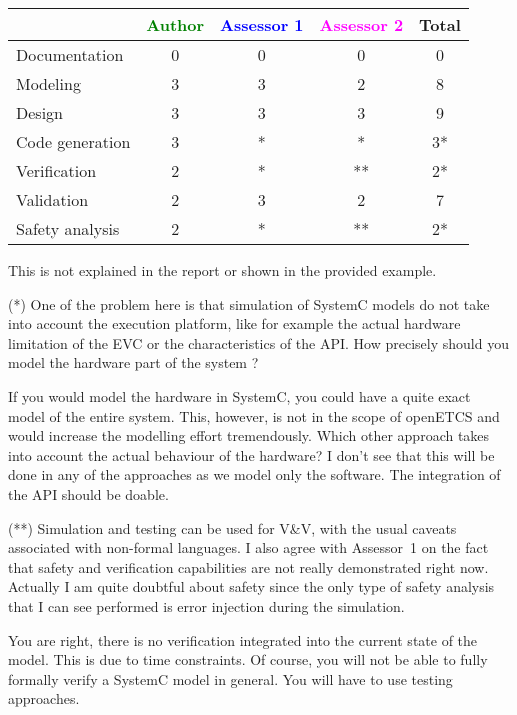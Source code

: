 \begin{tabular}{|l | c | c | c | c|}
\hline
& \textcolor{green}{Author} & \textcolor{blue}{Assessor 1} & \textcolor{magenta}{Assessor 2} & Total \\
\hline
Documentation &0 & 0 & 0 & 0 \\
\hline
Modeling &3 & 3 & 2 & 8 \\
\hline
Design &3 &3 & 3 & 9 \\
\hline
Code generation &3 & *  & * & 3* \\
\hline
Verification &2 &* & ** & 2* \\
\hline
Validation &2 &3 & 2 & 7 \\
\hline
Safety analysis &2 &* & ** & 2* \\
\hline
\end{tabular}
\begin{assessor1}
This is not explained in the report or shown in  the provided example.
\end{assessor1}

\begin{assessor2}
  \begin{item}
  \item[(*)] One of the problem here is that simulation of SystemC
    models do not take into account the execution platform, like for
    example the actual hardware limitation of the EVC or the
    characteristics of the API. How precisely should you model the
    hardware part of the system ?
\begin{author_comment}
If you would model the hardware in SystemC, you could have a quite exact model of the entire system. This, however, is not in the scope of openETCS and would increase the modelling effort tremendously. Which other approach takes into account the actual behaviour of the hardware? I don't see that this will be done in any of the approaches as we model only the software. The integration of the API should be doable.
\end{author_comment}
  \item[(**)] Simulation and testing can be used for V\&V, with the
    usual caveats associated with non-formal languages. I also agree
    with Assessor~1 on the fact that safety and verification
    capabilities are not really demonstrated right now. Actually I am
    quite doubtful about safety since the only type of safety analysis
    that I can see performed is error injection during the simulation.
\begin{author_comment}
You are right, there is no verification integrated into the current state of the model. This is due to time constraints. Of course, you will not be able to fully formally verify a SystemC model in general. You will have to use testing approaches.
\end{author_comment}
  \end{item}
\end{assessor2}

